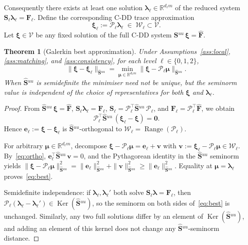 \documentclass[11pt,a4paper]{article}
\newtheorem{theorem}{Theorem}[section]
\theoremstyle{definition}
\newcommand{\R}{\mathbb{R}}
\newcommand{\trac}{\bm{\lambda}}
\newcommand{\Schur}{\mathbf{S}}
\newcommand{\Shatuu}{\widehat{\Schur}{}^{uu}}
\newcommand{\Fhat}{\widehat{\bm{F}}}
\newcommand{\zero}{\bm{0}}
\newcommand{\Range}{\operatorname{Range}}
\newcommand{\Ker}{\operatorname{Ker}}
\newcommand{\Vspace}{\mathcal{V}}
\newcommand{\Wspace}{\mathcal{W}}
\newcommand{\Pcal}{\mathcal{P}}
\begin{document}
Consequently there exists at least one solution $\trac_\ell \in
\R^{d_\ell m}$ of the reduced system
$\Schur_\ell \trac_\ell = \bm{F}_\ell$.
Define the corresponding C-DD trace approximation
\begin{equation}\label{eq:xi-ell}
  \bm{\xi}_\ell := \Pcal_\ell \trac_\ell \;\in\; \Wspace_\ell \subset \Vspace.
\end{equation}
Let $\bm{\xi} \in \Vspace$ be any fixed solution of the full C-DD
system $\Shatuu\,\bm{\xi} = \Fhat$.

\begin{theorem}[Galerkin best approximation]\label{thm:best}
  Under Assumptions~\ref{ass:local}, \ref{ass:matching}, and
  \ref{ass:consistency}, for each level $\ell\in\{0,1,2\}$,
  \begin{equation}\label{eq:best}
    \|\bm{\xi} - \bm{\xi}_\ell\|_{\Shatuu}
    = \min_{\bm{\mu}\in\R^{d_\ell m}}
      \|\bm{\xi} - \Pcal_\ell\bm{\mu}\|_{\Shatuu}.
  \end{equation}
  When $\Shatuu$ is semidefinite the minimiser need not be unique,
  but the seminorm value is independent of the choice of
  representatives for both $\bm{\xi}$ and $\trac_\ell$.
\end{theorem}

\begin{proof}
  From $\Shatuu\,\bm{\xi} = \Fhat$,
  $\Schur_\ell \trac_\ell = \bm{F}_\ell$,
  $\Schur_\ell = \Pcal_\ell^\top \Shatuu\,\Pcal_\ell$, and
  $\bm{F}_\ell = \Pcal_\ell^\top \Fhat$, we obtain
  \begin{equation}\label{eq:ortho}
    \Pcal_\ell^\top \Shatuu\,(\bm{\xi}_\ell - \bm{\xi}) = \zero.
  \end{equation}
  Hence $\bm{e}_\ell := \bm{\xi} - \bm{\xi}_\ell$ is
  $\Shatuu$-orthogonal to $\Wspace_\ell = \Range(\Pcal_\ell)$.

  For arbitrary $\bm{\mu}\in\R^{d_\ell m}$, decompose
  $\bm{\xi} - \Pcal_\ell\bm{\mu}
   = \bm{e}_\ell + \bm{v}$
  with $\bm{v} := \bm{\xi}_\ell - \Pcal_\ell\bm{\mu}
  \in \Wspace_\ell$.
  By~\eqref{eq:ortho}, $\bm{e}_\ell^\top \Shatuu\,\bm{v} = 0$, and the
  Pythagorean identity in the $\Shatuu$ seminorm yields
  $\|\bm{\xi} - \Pcal_\ell\bm{\mu}\|_{\Shatuu}^2
   = \|\bm{e}_\ell\|_{\Shatuu}^2 + \|\bm{v}\|_{\Shatuu}^2
   \ge \|\bm{e}_\ell\|_{\Shatuu}^2$.
  Equality at $\bm{\mu} = \trac_\ell$ proves~\eqref{eq:best}.

  Semidefinite independence: if $\trac_\ell,\trac_\ell'$ both solve
  $\Schur_\ell\trac = \bm{F}_\ell$, then
  $\Pcal_\ell(\trac_\ell-\trac_\ell') \in \Ker(\Shatuu)$,
  so the seminorm on both sides of~\eqref{eq:best} is unchanged.
  Similarly, any two full solutions differ by an element of
  $\Ker(\Shatuu)$, and adding an element of this kernel does not change
  any $\Shatuu$-seminorm distance.
\end{proof}
\end{document}
